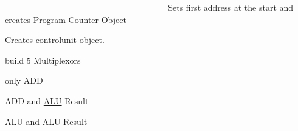 ~\newline
~\newline
~\newline
~\newline
~\newline
~\newline
~\newline
~\newline
~\newline
~\newline
~\newline
~\newline
~\newline
~\newline
~\newline
~\newline
~\newline
~\newline
~\newline
~\newline
~\newline
~\newline
~\newline
 Sets first address at the start and creates Program Counter Object

Creates controlunit object.

build 5 Multiplexors

only A\+DD

A\+DD and \mbox{\hyperlink{class_a_l_u}{A\+LU}} Result

\mbox{\hyperlink{class_a_l_u}{A\+LU}} and \mbox{\hyperlink{class_a_l_u}{A\+LU}} Result

